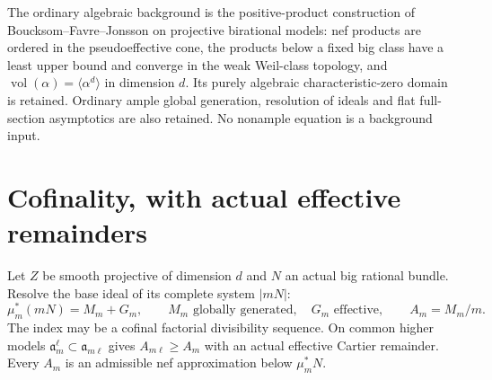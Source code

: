 \documentclass[10pt]{article}
\newcommand{\vol}{\operatorname{vol}}
\begin{document}
The ordinary algebraic background is the positive-product construction
of Boucksom--Favre--Jonsson on projective birational models: nef products
are ordered in the pseudoeffective cone, the products below a fixed big
class have a least upper bound and converge in the weak Weil-class
topology, and $\vol(\alpha)=\langle\alpha^d\rangle$ in dimension $d$.
Its purely algebraic characteristic-zero domain is retained. Ordinary
ample global generation, resolution of ideals and flat full-section
asymptotics are also retained. No nonample equation is a background input.

\section{Cofinality, with actual effective remainders}
Let $Z$ be smooth projective of dimension $d$ and $N$ an actual big
rational bundle. Resolve the base ideal of its complete system $|mN|$:
\[
 \mu_m^*(mN)=M_m+G_m,\qquad M_m\text{ globally generated},\quad
 G_m\text{ effective},\qquad A_m=M_m/m.                \tag{1}
\]
The index may be a cofinal factorial divisibility sequence. On common
higher models $\mathfrak a_m^\ell\subset\mathfrak a_{m\ell}$ gives
$A_{m\ell}\geq A_m$ with an actual effective Cartier remainder.
Every $A_m$ is an admissible nef approximation below $\mu_m^*N$.
\end{document}
